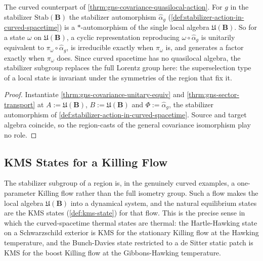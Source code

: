 \begin{theorem}
    \label{thrm:gns-covariance-stabilizer-action}
    \leanok
    The curved counterpart of \ref{thrm:gns-covariance-quasilocal-action}. For $g$ in the stabilizer $\mathrm{Stab}(\mathbf{B})$ the stabilizer automorphism $\hat\alpha_g$ (\ref{def:stabilizer-action-in-curved-spacetime}) is a $*$-automorphism of the single local algebra $\mathfrak{U}(\mathbf{B})$. So for a state $\omega$ on $\mathfrak{U}(\mathbf{B})$, a cyclic representation reproducing $\omega \circ \hat\alpha_g$ is unitarily equivalent to $\pi_\omega \circ \hat\alpha_g$, is irreducible exactly when $\pi_\omega$ is, and generates a factor exactly when $\pi_\omega$ does. Since curved spacetime has no quasilocal algebra, the stabilizer subgroup replaces the full Lorentz group here: the superselection type of a local state is invariant under the symmetries of the region that fix it.
\end{theorem}
\begin{proof}
    \leanok
    Instantiate \ref{thrm:gns-covariance-unitary-equiv} and \ref{thrm:gns-sector-transport} at $A := \mathfrak{U}(\mathbf{B})$, $B := \mathfrak{U}(\mathbf{B})$ and $\Phi := \hat\alpha_g$, the stabilizer automorphism of \ref{def:stabilizer-action-in-curved-spacetime}. Source and target algebra coincide, so the region-casts of the general covariance isomorphism play no role.
\end{proof}

\subsection{KMS States for a Killing Flow}

The stabilizer subgroup of a region is, in the genuinely curved examples, a one-parameter Killing flow rather than the full isometry group. Such a flow makes the local algebra $\mathfrak{U}(\mathbf{B})$ into a dynamical system, and the natural equilibrium states are the KMS states (\ref{def:kms-state}) for that flow. This is the precise sense in which the curved-spacetime thermal states are thermal: the Hartle-Hawking state on a Schwarzschild exterior is KMS for the stationary Killing flow at the Hawking temperature, and the Bunch-Davies state restricted to a de Sitter static patch is KMS for the boost Killing flow at the Gibbons-Hawking temperature.


